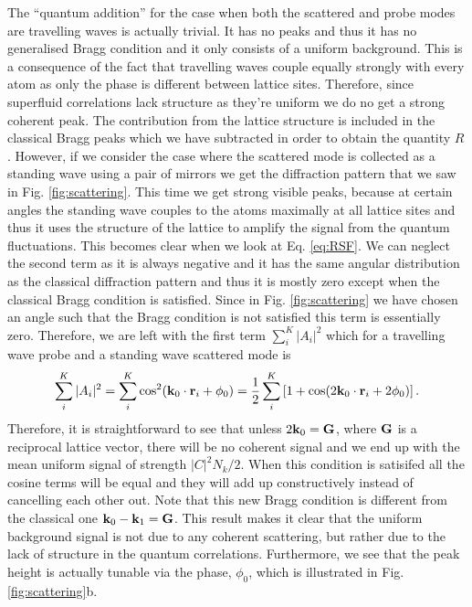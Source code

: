 The ``quantum addition'' for the case when both the scattered and
probe modes are travelling waves is actually trivial. It has no peaks
and thus it has no generalised Bragg condition and it only consists of
a uniform background. This is a consequence of the fact that
travelling waves couple equally strongly with every atom as only the
phase is different between lattice sites. Therefore, since superfluid
correlations lack structure as they're uniform we do no get a strong
coherent peak. The contribution from the lattice structure is included
in the classical Bragg peaks which we have subtracted in order to
obtain the quantity $R$. However, if we consider the case where the
scattered mode is collected as a standing wave using a pair of mirrors
we get the diffraction pattern that we saw in
Fig. \ref{fig:scattering}. This time we get strong visible peaks,
because at certain angles the standing wave couples to the atoms
maximally at all lattice sites and thus it uses the structure of the
lattice to amplify the signal from the quantum fluctuations. This
becomes clear when we look at Eq. \eqref{eq:RSF}. We can neglect the
second term as it is always negative and it has the same angular
distribution as the classical diffraction pattern and thus it is
mostly zero except when the classical Bragg condition is
satisfied. Since in Fig. \ref{fig:scattering} we have chosen an angle
such that the Bragg condition is not satisfied this term is
essentially zero. Therefore, we are left with the first term
$\sum_i^K |A_i|^2$ which for a travelling wave probe and a standing
wave scattered mode is
\begin{equation}
  \sum_i^K |A_i|^2 = \sum_i^K \cos^2(\mathbf{k}_0 \cdot \mathbf{r}_i + \phi_0) =
  \frac{1}{2} \sum_i^K \left[1 + \cos(2 \mathbf{k}_0 \cdot \mathbf{r}_i + 2
    \phi_0) \right].
\end{equation}
Therefore, it is straightforward to see that unless
$2 \mathbf{k}_0 = \mathbf{G}$, where $\mathbf{G}$ is a reciprocal lattice vector,
there will be no coherent signal and we end up with the mean uniform
signal of strength $|C|^2 N_k/2$. When this condition is satisifed all
the cosine terms will be equal and they will add up constructively
instead of cancelling each other out. Note that this new Bragg
condition is different from the classical one
$\mathbf{k}_0 - \mathbf{k}_1 = \mathbf{G}$. This result makes it clear that the
uniform background signal is not due to any coherent scattering, but
rather due to the lack of structure in the quantum
correlations. Furthermore, we see that the peak height is actually
tunable via the phase, $\phi_0$, which is illustrated in
Fig. \ref{fig:scattering}b.

